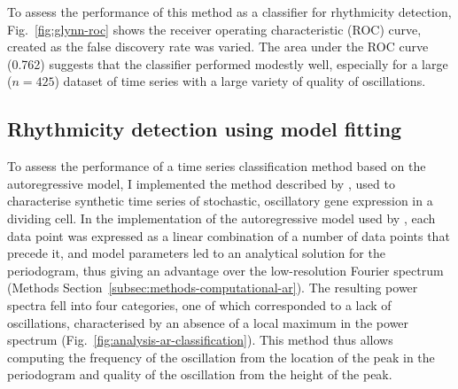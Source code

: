 To assess the performance of this method as a classifier for rhythmicity detection, Fig.\ \ref{fig:glynn-roc} shows the receiver operating characteristic (ROC) curve, created as the false discovery rate was varied.
The area under the ROC curve (0.762) suggests that the classifier performed modestly well, especially for a large ($n=425$) dataset of time series with a large variety of quality of oscillations.


\subsection{Rhythmicity detection using model fitting}
\label{subsec:analysis-classification-ar}

To assess the performance of a time series classification method based on the autoregressive model, I implemented the method described by \textcite{jiaFrequencyDomainAnalysis2020}, used to characterise synthetic time series of stochastic, oscillatory gene expression in a dividing cell.
In the implementation of the autoregressive model used by \textcite{jiaFrequencyDomainAnalysis2020}, each data point was expressed as a linear combination of a number of data points that precede it, and model parameters led to an analytical solution for the periodogram, thus giving an advantage over the low-resolution Fourier spectrum (Methods Section~\ref{subsec:methods-computational-ar}).
The resulting power spectra fell into four categories, one of which corresponded to a lack of oscillations, characterised by an absence of a local maximum in the power spectrum (Fig.\ \ref{fig:analysis-ar-classification}).
This method thus allows computing the frequency of the oscillation from the location of the peak in the periodogram and quality of the oscillation from the height of the peak.

